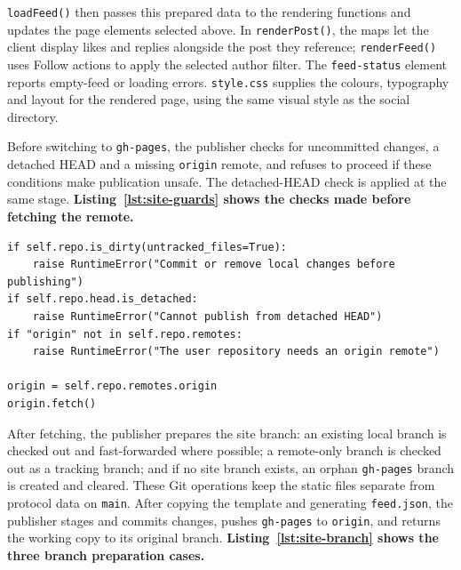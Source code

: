 \texttt{loadFeed()} then passes this prepared data to the rendering
functions and updates the page elements selected above. In
\texttt{renderPost()}, the maps let the client display likes and replies
alongside the post they reference; \texttt{renderFeed()} uses Follow actions
to apply the selected author filter. The \texttt{feed-status} element reports
empty-feed or loading errors. \texttt{style.css} supplies the colours,
typography and layout for the rendered page, using the same visual style as
the social directory.


Before switching to \texttt{gh-pages}, the publisher checks for
uncommitted changes, a detached HEAD and a missing \texttt{origin} remote,
and refuses to proceed if these conditions make publication unsafe. The
detached-HEAD check is applied at the same stage.
\textbf{Listing~\ref{lst:site-guards} shows the checks made before fetching
the remote.}

\begin{lstlisting}[caption={Checking the repository before site publication},label={lst:site-guards}]
if self.repo.is_dirty(untracked_files=True):
    raise RuntimeError("Commit or remove local changes before publishing")
if self.repo.head.is_detached:
    raise RuntimeError("Cannot publish from detached HEAD")
if "origin" not in self.repo.remotes:
    raise RuntimeError("The user repository needs an origin remote")

origin = self.repo.remotes.origin
origin.fetch()
\end{lstlisting}

After fetching, the publisher prepares the site branch: an existing
local branch is checked out and fast-forwarded where possible; a remote-only
branch is checked out as a tracking branch; and if no site branch exists, an
orphan \texttt{gh-pages} branch is created and cleared. These Git operations
keep the static files separate from protocol data on \texttt{main}. After
copying the template and generating \texttt{feed.json}, the publisher stages
and commits changes, pushes \texttt{gh-pages} to \texttt{origin}, and returns
the working copy to its original branch.
\textbf{Listing~\ref{lst:site-branch} shows the three branch preparation
cases.}

